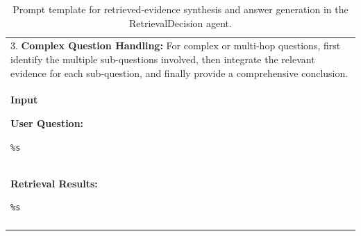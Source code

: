 {\begin{longtable}{@{}p{}@{}}
3. \textbf{Complex Question Handling:} For complex or multi-hop questions, first identify the multiple sub-questions involved, then integrate the relevant evidence for each sub-question, and finally provide a comprehensive conclusion.
\\


\textbf{Input}\par
\smallskip

\textbf{User Question:}\par
\texttt{\%s}
\\

\textbf{Retrieval Results:}\par
\texttt{\%s}
\\


\bottomrule
\caption{Prompt template for retrieved-evidence synthesis and answer generation in the RetrievalDecision agent.}
\label{tab:retrieval-answer-prompt}\\

\end{longtable}
}